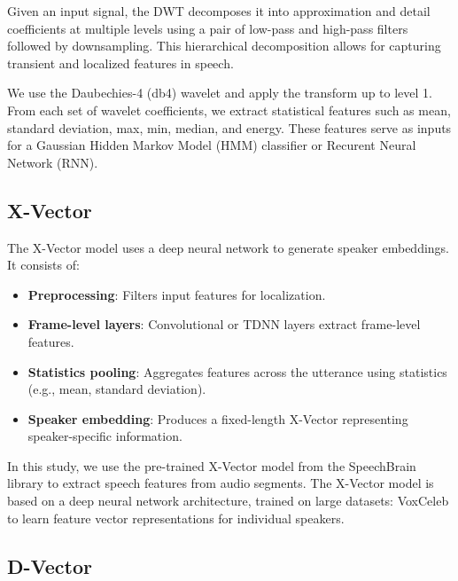 \documentclass[conference]{IEEEtran}
\begin{document}
Given an input signal, the DWT decomposes it into approximation and detail
coefficients at multiple levels using a pair of low-pass and high-pass filters followed by downsampling. This hierarchical decomposition allows for capturing transient and localized features in speech.

We use the Daubechies-4 (db4) wavelet and apply the transform up to level 1.
From each set of wavelet coefficients, we extract statistical features such as mean, standard deviation, max, min, median, and energy. These features serve as inputs for a Gaussian Hidden Markov Model (HMM) classifier or Recurent Neural Network (RNN). \cite{tufekci2000dwt}















\subsection{X-Vector}

The X-Vector model uses a deep neural network to generate speaker embeddings. It consists of:

\begin{itemize} \item \textbf{Preprocessing}: Filters input features for localization.
    \item \textbf{Frame-level layers}: Convolutional or TDNN layers extract
          frame-level features. \item \textbf{Statistics pooling}: Aggregates
          features across the utterance using statistics (e.g., mean, standard deviation).
    \item \textbf{Speaker embedding}: Produces a fixed-length X-Vector
          representing speaker-specific information. \end{itemize}


In this study, we use the pre-trained X-Vector model from the SpeechBrain
library to extract speech features from audio segments. The X-Vector model
is based on a deep neural network architecture, trained on large
datasets: VoxCeleb to learn feature vector representations
for individual speakers.




\subsection{D-Vector}
\end{document}
